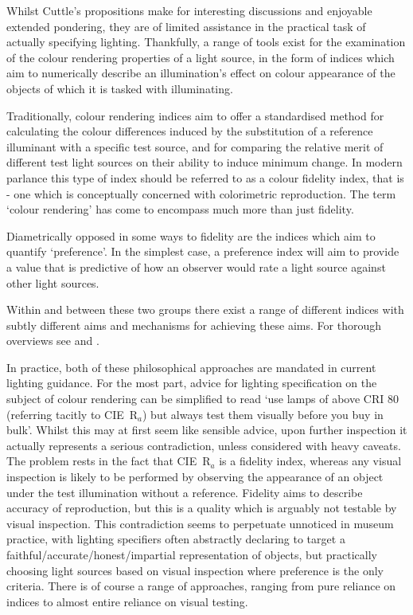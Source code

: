 Whilst Cuttle's propositions make for interesting discussions and enjoyable extended pondering, they are of limited assistance in the practical task of actually specifying lighting. Thankfully, a range of tools exist for the examination of the colour rendering properties of a light source, in the form of indices which aim to numerically describe an illumination's effect on colour appearance of the objects of which it is tasked with illuminating.

Traditionally, colour rendering indices aim to offer a standardised method for calculating the colour differences induced by the substitution of a reference illuminant with a specific test source, and for comparing the relative merit of different test light sources on their ability to induce minimum change. In modern parlance this type of index should be referred to as a colour fidelity index, that is - one which is conceptually concerned with colorimetric reproduction. The term `colour rendering' has come to encompass much more than just fidelity.

Diametrically opposed in some ways to fidelity are the indices which aim to quantify `preference'. In the simplest case, a preference index will aim to provide a value that is predictive of how an observer would rate a light source against other light sources. 

Within and between these two groups there exist a range of different indices with subtly different aims and mechanisms for achieving these aims. For thorough overviews see \citet{guo_review_2004} and \citet{houser_review_2013}.

In practice, both of these philosophical approaches are mandated in current lighting guidance. For the most part, advice for lighting specification on the subject of colour rendering can be simplified to read `use lamps of above \gls{CRI} 80 (referring tacitly to \gls{CIE}~R$_a$) but always test them visually before you buy in bulk'. Whilst this may at first seem like sensible advice, upon further inspection it actually represents a serious contradiction, unless considered with heavy caveats. The problem rests in the fact that \gls{CIE}~R$_a$ is a fidelity index, whereas any visual inspection is likely to be performed by observing the appearance of an object under the test illumination without a reference. Fidelity aims to describe accuracy of reproduction, but this is a quality which is arguably not testable by visual inspection. This contradiction seems to perpetuate unnoticed in museum practice, with lighting specifiers often abstractly declaring to target a faithful/accurate/honest/impartial representation of objects, but practically choosing light sources based on visual inspection where preference is the only criteria. There is of course a range of approaches, ranging from pure reliance on indices to almost entire reliance on visual testing.

